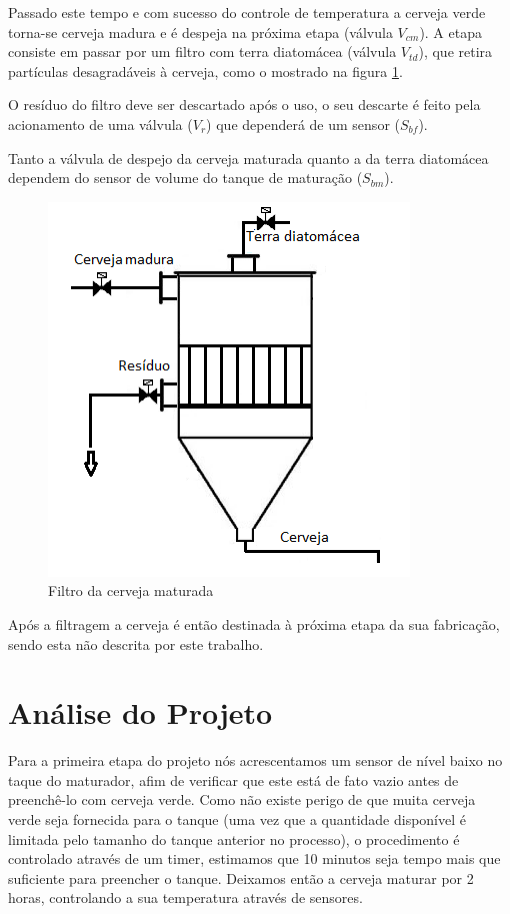 \documentclass[twoside,twocolumn,12pt]{paper}
\begin{document}
	Passado este tempo e com sucesso do controle de temperatura a cerveja verde torna-se cerveja madura e é despeja na próxima etapa (válvula $V_{cm}$). A etapa consiste em passar por um filtro com terra diatomácea (válvula $V_{td}$), que retira partículas desagradáveis à cerveja, como o mostrado na figura \ref{fig:filtro}. 
	
	O resíduo do filtro deve ser descartado após o uso, o seu descarte é feito pela acionamento de uma válvula ($V_r$) que dependerá de um sensor ($S_{bf}$).
	
	
	Tanto a válvula de despejo da cerveja maturada quanto a da terra diatomácea dependem do sensor de volume do tanque de maturação ($S_{bm}$).
	
	\begin{figure}
		\centering
		\includegraphics [width=\columnwidth]{filtro.png}
		\caption {Filtro da cerveja maturada}
		\label{fig:filtro}
	\end{figure}
	
	Após a filtragem a cerveja é então destinada à próxima etapa da sua fabricação, sendo esta não descrita por este trabalho.
	
	\section {Análise do Projeto}
	\label{sec:analise}
	Para a primeira etapa do projeto nós acrescentamos um sensor de nível baixo no taque do maturador, afim de verificar que este está de fato vazio antes de preenchê-lo com cerveja verde. Como não existe perigo de que muita cerveja verde seja fornecida para o tanque (uma vez que a quantidade disponível é limitada pelo tamanho do tanque anterior no processo), o procedimento é controlado através de um timer, estimamos que 10 minutos seja tempo mais que suficiente para preencher o tanque. Deixamos então a cerveja maturar por 2 horas, controlando a sua temperatura através de sensores.
	
\end{document}
